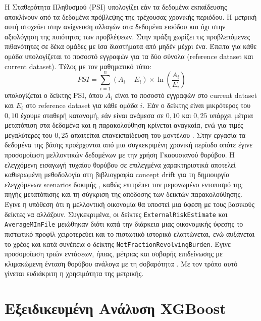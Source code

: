 Η Σταθερότητα Πληθυσμού (PSI) υπολογίζει εάν τα δεδομένα εκπαίδευσης
αποκλίνουν από τα δεδομένα πρόβλεψης της τρέχουσας χρονικής περιόδου.
Η μετρική αυτή στοχεύει στην ανίχνευση αλλαγών στα δεδομένα εισόδου
και όχι στην αξιολόγηση της ποιότητας των προβλέψεων. Στην πράξη
χωρίζει τις προβλεπόμενες πιθανότητες σε δέκα ομάδες με ίσα διαστήματα
από μηδέν μέχρι ένα. Έπειτα για κάθε ομάδα υπολογίζεται το ποσοστό
εγγραφών για τα δύο σύνολα (reference dataset και current dataset).
Τέλος με τον μαθηματικό τύπο:
\begin{equation}
    PSI = \sum_{i=1}^{n} (A_i - E_i) \times \ln\left(\frac{A_i}{E_i}\right)
    \label{eq:psi}
\end{equation}
υπολογίζεται ο δείκτης PSI, όπου $A_i$ είναι το ποσοστό εγγραφών στο
current dataset και $E_i$ στο reference dataset για κάθε ομάδα $i$.
Εάν ο δείκτης είναι μικρότερος του $0{,}10$ έχουμε σταθερή κατανομή,
εάν είναι ανάμεσα σε $0{,}10$ και $0{,}25$ υπάρχει μέτρια μετατόπιση
στα δεδομένα και η παρακολούθηση κρίνεται αναγκαία, ενώ για τιμές
μεγαλύτερες του $0{,}25$ απαιτείται επανεκπαίδευση του μοντέλου \citep{yurdakul2018statistical, siddiqi2017intelligent}.
Στην εργασία τα δεδομένα της βάσης προέρχονται από μια συγκεκριμένη
χρονική περίοδο οπότε έγινε προσομοίωση μελλοντικών δεδομένων με την
χρήση Γκαουσιανού θορύβου. Η ελεγχόμενη εισαγωγή τυχαίου θορύβου σε επιλεγμένα 
χαρακτηριστικά αποτελεί καθιερωμένη μεθοδολογία στη βιβλιογραφία concept drift 
για τη δημιουργία ελεγχόμενων scenarios δοκιμής \citep{gama2014, widmer1996learning}, 
καθώς επιτρέπει τον μεμονωμένο εντοπισμό της πηγής μετατόπισης και τη σύγκριση της απόδοσης 
των δεικτών παρακολούθησης. Έγινε η υπόθεση ότι η μελλοντική οικονομία
θα υποστεί μια ύφεση με τους βασικούς δείκτες να αλλάζουν.
Συγκεκριμένα, οι δείκτες \texttt{ExternalRiskEstimate} και
\texttt{AverageMInFile} μειώθηκαν διότι κατά την διάρκεια μιας
οικονομικής ύφεσης το πιστωτικό προφίλ χειροτερεύει και το πιστωτικό
ιστορικό ελαττώνεται, ενώ αυξάνεται το χρέος και κατά συνέπεια ο
δείκτης \texttt{NetFractionRevolvingBurden}. Έγινε προσομοίωση τριών εντάσεων, ήπιας, μέτριας και σοβαρής επιδείνωσης
με κλιμακώμενη ένταση θορύβου ανάλογα με τη σοβαρότητα \citep{yurdakul2018statistical}. Με τον τρόπο αυτό γίνεται
ευδιάκριτη η χρησιμότητα της μετρικής.

\section{Εξειδικευμένη Ανάλυση XGBoost}
\label{sec:xgboost_analysis}

